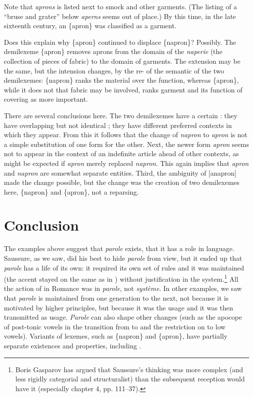 \documentclass[output=paper,
modfonts
]{LSP/langsci}
\begin{document}
Note that \emph{aprons} is listed next to smock and other garments. (The
listing of a ``bruse and grater'' below \emph{aperns} seems out of
place.) By this time, in the late sixteenth century, an \{apron\} was
classified as a garment.

Does this explain why \{apron\} continued to displace \{napron\}?
Possibly. The demilexeme \{apron\} removes aprons from the domain of the
\emph{naperie} (the collection of pieces of fabric) to the domain of
garments. The extension may be the same, but the intension changes, by
the re- of the semantic  of the two demilexemes:
\{napron\} ranks the material over the function, whereas \{apron\},
while it does not that fabric may be involved, ranks garment and its
function of covering as more important.

There are several conclusions here. The two demilexemes have a certain
: they have overlapping but not identical ; they have
different preferred contexts in which they appear. From this it follows
that the change of \emph{napron} to \emph{apron} is not a simple
substitution of one form for the other. Next, the newer form
\emph{apron} seems not to appear in the context of an indefinite article
ahead of other contexts, as might be expected if \emph{apron} merely
replaced \emph{napron}. This again implies that \emph{apron} and
\emph{napron} are somewhat separate entities. Third, the ambiguity of
{[}anapron{]} made the change possible, but the change was the creation
of two demilexemes here, \{napron\} and \{apron\}, not a reparsing.

\section{Conclusion}\label{conclusionT}

The examples above suggest that \emph{parole} exists, that it has a role
in language. Saussure, as we saw, did his best to hide \emph{parole}
from view, but it ended up that \emph{parole} has a life of its own: it
required its own set of rules and it was maintained (the accent stayed
on the same  as in ) without justification in the
system.\footnote{Boris Gasparov \citeyearpar{gasparov2012} has argued that Saussure's
  thinking was more complex (and less rigidly categorial and
  structuralist) than the subsequent reception would have it (especially
  chapter 4, pp. 111--37).}  All the action of  in Romance was in
\emph{parole}, not \emph{système}. In other examples, we saw that
\emph{parole} is maintained from one generation to the next, not because
it is motivated by higher principles, but because it was the usage and
it was then transmitted as usage. \emph{Parole} can also shape other
changes (such as the apocope of post-tonic vowels in the transition from
 to  and the restriction on  to low vowels).
Variants of lexemes, such as \{napron\} and \{apron\}, have partially
separate existences and properties, including .
\end{document}
